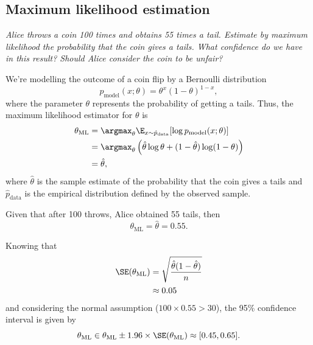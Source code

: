 \documentclass[12pt]{article}
\begin{document}
  \subsection{Maximum likelihood estimation}

  \begin{displayquote}
    \itshape{}
    Alice throws a coin 100 times and obtains 55 times a tail. Estimate by
    maximum likelihood the probability that the coin gives a tails. What
    confidence do we have in this result? Should Alice consider the coin to be
    unfair?
  \end{displayquote}

  We're modelling the outcome of a coin flip by a Bernoulli distribution 
  \begin{equation}
    p_{\text{model}}(x; \theta) = \theta^x {(1 - \theta)}^{1 - x},
  \end{equation} 
  where the parameter $\theta$ represents the probability of getting a tails.
  Thus, the maximum likelihood estimator for $\theta$ is
  \begin{equation}
    \begin{split}
      \theta_{\text{ML}} &= \argmax_\theta \E_{x \sim
        \hat{p}_{\text{data}}} [\log p_{\text{model}}(x; \theta)]\\
      &= \argmax_\theta \left(\hat{\theta} \log\theta + (1 -
        \hat{\theta}) \log(1 - \theta)\right)\\
      &= \hat{\theta},
    \end{split}
  \end{equation}
  where $\hat{\theta}$ is the sample estimate of the probability that the
  coin gives a tails and $\hat{p}_{\text{data}}$ is the empirical
  distribution defined by the observed sample.

  Given that after 100 throws, Alice obtained 55 tails, then
  \begin{equation}
    \theta_{\text{ML}} = \hat{\theta} = 0.55.
  \end{equation}

  Knowing that 
  \begin{equation}
    \begin{split}
      \SE(\theta_{\text{ML}}) &= \sqrt{\frac{\hat{\theta} (1 -
        \hat{\theta})}{n}}\\
      &\approx 0.05
    \end{split}
  \end{equation}
  and considering the normal assumption ($100 \times 0.55 > 30$), the 95\%
  confidence interval is given by
  \begin{equation}
    \theta_{\text{ML}} \in \theta_{\text{ML}} \pm 1.96\times
      \SE(\theta_{\text{ML}}) \approx [0.45, 0.65].
  \end{equation}
\end{document}
